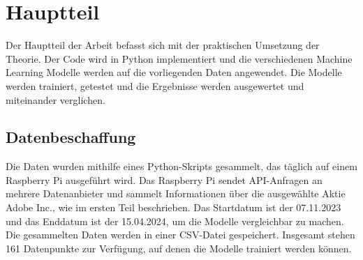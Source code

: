 \section{Hauptteil} \label{sec:Hauptteil}
Der Hauptteil der Arbeit befasst sich mit der praktischen Umsetzung der Theorie. Der Code wird in Python implementiert und die verschiedenen Machine Learning Modelle werden auf die vorliegenden Daten angewendet. Die Modelle werden trainiert, getestet und die Ergebnisse werden ausgewertet und miteinander verglichen.

\subsection{Datenbeschaffung} \label{sec:Datenbeschaffung}
Die Daten wurden mithilfe eines Python-Skripts gesammelt, das täglich auf einem Raspberry Pi ausgeführt wird. Das Raspberry Pi sendet API-Anfragen an mehrere Datenanbieter und sammelt Informationen über die ausgewählte Aktie Adobe Inc., wie im ersten Teil beschrieben. Das Startdatum ist der 07.11.2023 und das Enddatum ist der 15.04.2024, um die Modelle vergleichbar zu machen. Die gesammelten Daten werden in einer CSV-Datei gespeichert. Insgesamt stehen 161 Datenpunkte zur Verfügung, auf denen die Modelle trainiert werden können.

